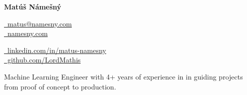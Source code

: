 \documentclass[a4paper,12pt]{article}
\begin{document}
\begin{center}
{\Huge\bfseries\filcenter Matúš Námešný}
\end{center}

\begin{center}
\begin{minipage}{0.45\textwidth}
  \begin{flushleft}
    \href{mailto:matus@namesny.com}{\faEnvelope\ matus@namesny.com} \\[4pt]
    \href{https://namesny.com}{\faGlobe\ namesny.com}
  \end{flushleft}
\end{minipage}
\hfill
\begin{minipage}{0.45\textwidth}
  \begin{flushleft}
    \href{https://www.linkedin.com/in/matus-namesny/}{\faLinkedin\ linkedin.com/in/matus-namesny} \\[4pt]
    \href{https://www.github.com/LordMathis}{\faGithub\ github.com/LordMathis}
  \end{flushleft}
\end{minipage}
\end{center}

 \noindent Machine Learning Engineer with 4+ years of experience in  in guiding projects from proof of concept to production.
\end{document}

